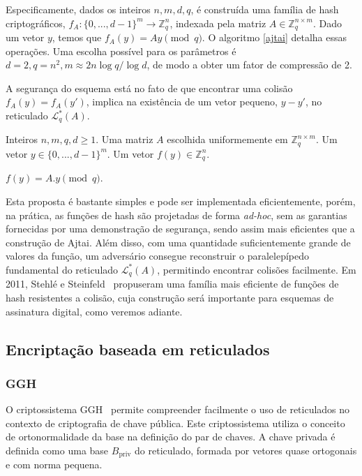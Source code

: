 \documentclass{SBCbookchapter}
\begin{document}
\begin{otherlanguage}{brazilian}
Especificamente, dados os inteiros $n,m,d,q$, é construída uma família de hash criptográficos, $f_A : \{0,...,d-1\}^m \rightarrow \mathbb{Z}_q^n$, indexada pela matriz $A \in \mathbb{Z}_q^{n \times m}$. Dado um vetor $y$, temos que $f_A(y) = Ay \pmod q$. O algoritmo \ref{ajtai} detalha essas operações. Uma escolha possível para os parâmetros é $d=2, q=n^2, m \approx 2n \log q / \log d$, de modo a obter um fator de compressão de 2. 

A segurança do esquema está no fato de que encontrar uma colisão $f_A(y) = f_A(y')$, implica na existência de um vetor pequeno, $y-y'$, no reticulado $\mathcal{L}_q^*(A)$.

\begin{algorithm}
\begin{algorithmic}
\Require Inteiros $n, m, q, d \geq 1$. Uma matriz $A$ escolhida uniformemente em $\mathbb{Z}_q^{n \times m}$. Um vetor $y \in \{0, ..., d-1\}^m$.
\Ensure Um vetor $f(y) \in \mathbb{Z}^n_q$. 

\Return $f(y) = A.y \pmod q$.
\end{algorithmic}
\caption{Hash de Ajtai}
\label{ajtai}
\end{algorithm}

Esta proposta é bastante simples e pode ser implementada eficientemente, porém, na prática, as funções de hash são projetadas de forma \emph{ad-hoc}, sem as garantias fornecidas por uma demonstração de segurança, sendo assim mais eficientes que a construção de Ajtai. Além disso, com uma quantidade suficientemente grande de valores da função, um adversário consegue reconstruir o paralelepípedo fundamental do reticulado $\mathcal{L}_q^*(A)$, permitindo encontrar colisões facilmente. 
Em 2011, Stehlé e Steinfeld~\cite{Stehle2011} propuseram uma família mais eficiente de funções de hash resistentes a colisão, cuja construção será importante para esquemas de assinatura digital, como veremos adiante. 

\subsection{Encriptação baseada em reticulados}

\subsubsection{GGH}

O criptossistema GGH~\cite{Goldreich-Goldwasser-Halevi} permite compreender facilmente o uso de reticulados no contexto de criptografia de chave pública. Este criptossistema utiliza o conceito de ortonormalidade da base na definição do par de chaves. A chave privada é definida como uma base $B_\mathrm{priv}$ do reticulado, formada por vetores quase ortogonais e com norma pequena. 



\end{otherlanguage}
\end{document}
